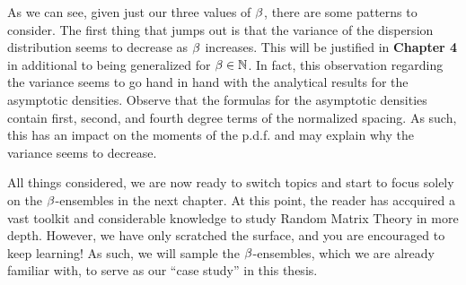 
As we can see, given just our three values of $\beta$, there are some patterns to consider.
The first thing that jumps out is that the variance of the dispersion distribution seems to decrease as $\beta$ increases.
This will be justified in \textbf{Chapter 4} in additional to being generalized for $\beta \in \mathbb{N}$. In fact, this observation
regarding the variance seems to go hand in hand with the analytical results for the asymptotic densities.
Observe that the formulas for the asymptotic densities contain first, second, and fourth degree terms of the normalized spacing.
As such, this has an impact on the moments of the p.d.f. and may explain why the variance seems to decrease.

\bigskip
\bigskip


All things considered, we are now ready to switch topics and start to focus solely on the $\beta$-ensembles in the next chapter.
At this point, the reader has accquired a vast toolkit and considerable knowledge to study Random Matrix Theory in more depth.
However, we have only scratched the surface, and you are encouraged to keep learning! As such, we will sample the $\beta$-ensembles, which we are already familiar with,
to serve as our ``case study'' in this thesis.

